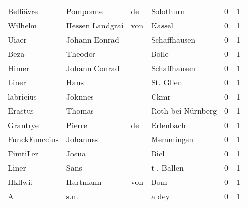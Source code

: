 \documentclass[10pt,a4paper,landscape]{article}
\begin{document}
\begin{longtable}{llllrr}
                Belliävre &                           Pomponne &          de &                                   Solothurn &          0 &         1 \\
                  Wilhelm &                    Hessen Landgrai &         von &                                      Kassel &          0 &         1 \\
                    Uiaer &                      Johann Eonrad &             &                                Schaffhausen &          0 &         1 \\
                     Beza &                            Theodor &             &                                       Bolle &          0 &         1 \\
                    Himer &                      Johann Conrad &             &                                Schaffhausen &          0 &         1 \\
                    Liner &                               Hans &             &                                   St. Gllen &          0 &         1 \\
                labrieius &                            Joknnes &             &                                        Ckmr &          0 &         1 \\
                  Erastus &                             Thomas &             &                           Roth bei Nürnberg &          0 &         1 \\
                 Grantrye &                             Pierre &          de &                                   Erlenbach &          0 &         1 \\
            FunckFunccius &                           Johannes &             &                                   Memmingen &          0 &         1 \\
                 FimtiLer &                              Josua &             &                                        Biel &          0 &         1 \\
                    Liner &                               Sans &             &                                  t . Ballen &          0 &         1 \\
                  Hkllwil &                           Hartmann &         von &                                         Bom &          0 &         1 \\
                        A &                               s.n. &             &                                       a dey &          0 &         1 \\

\end{longtable}
\end{document}
